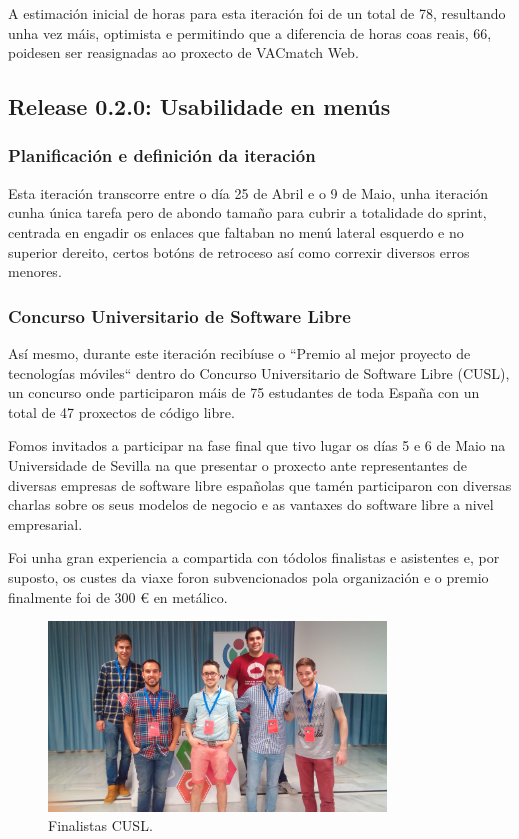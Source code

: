    A estimación inicial de horas para esta iteración foi de un total de 78, 
resultando unha vez máis, optimista e permitindo que a diferencia de horas 
coas reais, 66, poidesen ser reasignadas ao proxecto de VACmatch Web.

    \subsection{Release 0.2.0: Usabilidade en menús}

      \subsubsection{Planificación e definición da iteración}
      Esta iteración transcorre entre o día 25 de Abril e o 9 de Maio, 
unha iteración cunha única tarefa pero de abondo tamaño para 
cubrir a totalidade do sprint, centrada en engadir os enlaces que faltaban no 
menú lateral esquerdo e no superior dereito, certos botóns de retroceso así
como correxir diversos erros menores.

      \subsubsection{Concurso Universitario de Software Libre}
      Así mesmo, durante este iteración recibíuse o ``Premio al mejor proyecto 
de tecnologías móviles`` dentro do Concurso Universitario de Software Libre 
(CUSL), un concurso onde participaron máis de 75 estudantes de toda España con 
un total de 47 proxectos de código libre.

      Fomos invitados a participar na fase final que tivo lugar os días 5 e 6 
de Maio na Universidade de Sevilla na que presentar o proxecto ante 
representantes de diversas empresas de software libre españolas que tamén 
participaron con diversas charlas sobre os seus modelos de negocio e as 
vantaxes do software libre a nivel empresarial.

      Foi unha gran experiencia a compartida con tódolos finalistas e 
asistentes e, por suposto, os custes da viaxe foron subvencionados pola 
organización e o premio finalmente foi de 300 \euro{} en metálico.

    \begin{figure}[h!]
          \begin{center}
            \includegraphics[width=0.8\textwidth]{./img/final_cusl.jpg}
            \caption{Finalistas CUSL.}
            \label{fig:cusl}
          \end{center}
    \end{figure}

